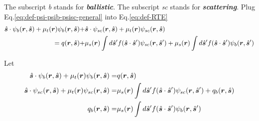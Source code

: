 \documentclass [10pt,letterpaper]{article}
\newcommand{\unitvectorsym}[1]{\hat{\vectorsym{#1}}}
\begin{document}
The subscript \emph{b} stands for \emph{\bf ballistic}.
The subscript \emph{sc} stands for \emph{\bf scattering}.
Plug Eq.\eqref{eq:def-psi-psib-psisc-general} into Eq.\eqref{eq:def-RTE}
\begin{equation} \label{eq:der-extracting-psib-general-1}
	\begin{split}
		\unitvectorsym{s}
		\cdot
		\psi_b(\vectorsym{r},\unitvectorsym{s})
		+
		\mu_t(\vectorsym{r})
		\psi_b(\vectorsym{r},\unitvectorsym{s})
		+&
		\unitvectorsym{s}
		\cdot
		\psi_{sc}(\vectorsym{r},\unitvectorsym{s})
		+
		\mu_t(\vectorsym{r})
		\psi_{sc}(\vectorsym{r},\unitvectorsym{s})
		\\
		=
		q(\vectorsym{r},\unitvectorsym{s})
		+&
		\mu_s(\vectorsym{r})
		\int d\unitvectorsym{s}^\prime
		f(\unitvectorsym{s}\cdot\unitvectorsym{s}^\prime)
		\psi_{sc}(\vectorsym{r},\unitvectorsym{s}^\prime) 
		+ 
		\mu_s(\vectorsym{r})
		\int d\unitvectorsym{s}^\prime
		f(\unitvectorsym{s}\cdot\unitvectorsym{s}^\prime)
		\psi_{b}(\vectorsym{r},\unitvectorsym{s}^\prime) 
	\end{split}
\end{equation}

Let
\begin{subequations} \label{eq:def-psib-psisc-qb-general}
	\begin{align} 
		\unitvectorsym{s}
		\cdot
		\psi_b(\vectorsym{r},\unitvectorsym{s})
		+
		\mu_t(\vectorsym{r})
		\psi_b(\vectorsym{r},\unitvectorsym{s})
		=&
		q(\vectorsym{r},\unitvectorsym{s})
		\label{eq:def-psib-general}
		\\ 
		\unitvectorsym{s}
		\cdot
		\psi_{sc}(\vectorsym{r},\unitvectorsym{s})
		+
		\mu_t(\vectorsym{r})
		\psi_{sc}(\vectorsym{r},\unitvectorsym{s})
		=&
		\mu_s(\vectorsym{r})
		\int d\unitvectorsym{s}^\prime
		f(\unitvectorsym{s}\cdot\unitvectorsym{s}^\prime)
		\psi_{sc}(\vectorsym{r},\unitvectorsym{s}^\prime) 
		+
		q_b(\vectorsym{r},\unitvectorsym{s})
		\label{eq:def-psisc-general}
		\\
		q_b(\vectorsym{r},\unitvectorsym{s})
		=&
		\mu_s(\vectorsym{r})
		\int d\unitvectorsym{s}^\prime
		f(\unitvectorsym{s}\cdot\unitvectorsym{s}^\prime)
		\psi_{b}(\vectorsym{r},\unitvectorsym{s}^\prime) 
		\label{eq:def-qb-general}
	\end{align}
\end{subequations}
\end{document}
